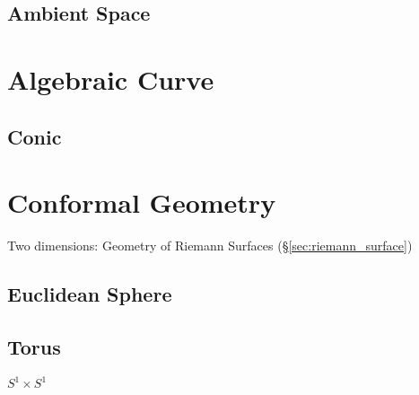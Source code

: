 \subsection{Ambient Space}\label{sec:ambient_space}




\section{Algebraic Curve}\label{sec:algebraic_curve}

\subsection{Conic}\label{sec:conic}



\section{Conformal Geometry}\label{sec:conformal_geometry}

Two dimensions: Geometry of Riemann Surfaces
(\S\ref{sec:riemann_surface})



\subsection{Euclidean Sphere}\label{sec:euclidean_sphere}

\subsection{Torus}\label{sec:torus}

$S^1 \times S^1$

